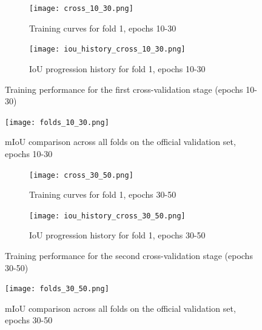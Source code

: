 \documentclass[]{article}
\begin{document}
\begin{figure}[htbp]
    \centering
    \begin{subfigure}[b]{0.8\textwidth}
        \centering
        \texttt{[image: cross\_10\_30.png]}
        \caption{Training curves for fold 1, epochs 10-30}
        \label{fig:cross_val_10_30}
    \end{subfigure}
    \vspace{0.5cm}
    \begin{subfigure}[b]{0.8\textwidth}
        \centering
        \texttt{[image: iou\_history\_cross\_10\_30.png]}
        \caption{IoU progression history for fold 1, epochs 10-30}
        \label{fig:cross_val_10_30_iou_his}
    \end{subfigure}
    \caption{Training performance for the first cross-validation stage (epochs 10-30)}
    \label{fig:cross_val_10_30_combined}
\end{figure}

\begin{figure}[htbp]
    \centering
    \texttt{[image: folds\_10\_30.png]}
    \caption{mIoU comparison across all folds on the official validation set, epochs 10-30}
    \label{fig:cross_val_10_30_val}
\end{figure}

\begin{figure}[htbp]
    \centering
    \begin{subfigure}[b]{0.8\textwidth}
        \centering
        \texttt{[image: cross\_30\_50.png]}
        \caption{Training curves for fold 1, epochs 30-50}
        \label{fig:cross_val_30_50}
    \end{subfigure}
    \vspace{0.5cm}
    \begin{subfigure}[b]{0.8\textwidth}
        \centering
        \texttt{[image: iou\_history\_cross\_30\_50.png]}
        \caption{IoU progression history for fold 1, epochs 30-50}
        \label{fig:cross_val_30_50_iou_his}
    \end{subfigure}
    \caption{Training performance for the second cross-validation stage (epochs 30-50)}
    \label{fig:cross_val_30_50_combined}
\end{figure}

\begin{figure}[htbp]
    \centering
    \texttt{[image: folds\_30\_50.png]}
    \caption{mIoU comparison across all folds on the official validation set, epochs 30-50}
    \label{fig:cross_val_30_50_val}
\end{figure}
\end{document}
